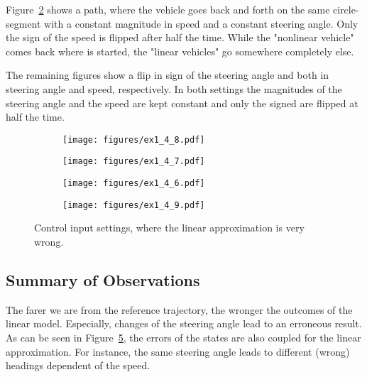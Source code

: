 Figure~\ref{fig:ex7} shows a path, where the vehicle goes back and forth on the same circle-segment with a constant magnitude in speed and a constant steering angle.
Only the sign of the speed is flipped after half the time.
While the "nonlinear vehicle" comes back where is started, the "linear vehicles" go somewhere completely else.

The remaining figures show a flip in sign of the steering angle and both in steering angle and speed, respectively.
In both settings the magnitudes of the steering angle and the speed are kept constant and only the signed are flipped at half the time.

\begin{figure}[h]
	\centering
	\begin{subfigure}{0.49\textwidth}
		\texttt{[image: figures/ex1\_4\_8.pdf]}
		\label{fig:ex8}
	\end{subfigure}
	\begin{subfigure}{0.49\textwidth}
		\texttt{[image: figures/ex1\_4\_7.pdf]}
		\label{fig:ex7}
	\end{subfigure}
	\begin{subfigure}{0.49\textwidth}
		\texttt{[image: figures/ex1\_4\_6.pdf]}
		\label{fig:ex6}
	\end{subfigure}
	\begin{subfigure}{0.49\textwidth}
		\texttt{[image: figures/ex1\_4\_9.pdf]}
		\label{fig:ex9}
	\end{subfigure}
	\caption{Control input settings, where the linear approximation is very wrong.}
	\label{fig:ex6789}
\end{figure}

\subsection{Summary of Observations}
The farer we are from the reference trajectory, the wronger the outcomes of the linear model. 
Especially, changes of the steering angle lead to an erroneous result.
As can be seen in Figure~\ref{fig:ex6789}, the errors of the states are also coupled for the linear approximation.
For instance, the same steering angle leads to different (wrong) headings dependent of the speed.
